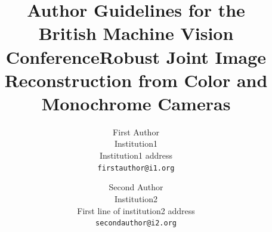 
\title{Author Guidelines for the\\ British Machine Vision Conference}




\def\eg{\emph{e.g}\bmvaOneDot}
\def\Eg{\emph{E.g}\bmvaOneDot}
\def\etal{\emph{et al}\bmvaOneDot}


	
	\title{Robust Joint Image Reconstruction from Color and Monochrome Cameras}
	
	\author{First Author\\
		Institution1\\
		Institution1 address\\
		{\tt\small firstauthor@i1.org}
		\and
		Second Author\\
		Institution2\\
		First line of institution2 address\\
		{\tt\small secondauthor@i2.org}
	}
	

